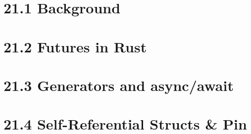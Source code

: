 \section{21.1 Background} %
\section{21.2 Futures in Rust} %
\section{21.3 Generators and async/await} %
\section{21.4 Self-Referential Structs \& Pin} %
